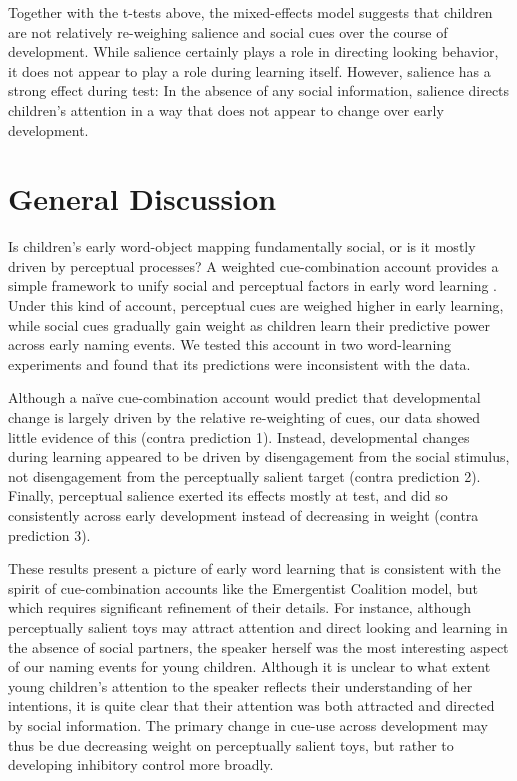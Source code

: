 \documentclass[man,floatsintext]{apa6}
\begin{document}
Together with the t-tests above, the mixed-effects model suggests that children are not relatively re-weighing salience and social cues over the course of development. While salience certainly plays a role in directing looking behavior, it does not appear to play a role during learning itself. However, salience has a strong effect during test: In the absence of any social information, salience directs children's attention in a way that does not appear to change over early development.

\section{General Discussion}

Is children's early word-object mapping fundamentally social, or is it mostly driven by perceptual processes? A weighted cue-combination account provides a simple framework to unify social and perceptual factors in early word learning \cite{Hollich2000, Frank2013a}. Under this kind of account, perceptual cues are weighed higher in early learning, while social cues gradually gain weight as children learn their predictive power across early naming events. We tested this account in two word-learning experiments and found that its predictions were inconsistent with the data. 

Although a na\"{i}ve cue-combination account would predict that developmental change is largely driven by the relative re-weighting of cues, our data showed little evidence of this (contra prediction 1). Instead, developmental changes during learning appeared to be driven by disengagement from the social stimulus, not disengagement from the perceptually salient target (contra prediction 2). Finally, perceptual salience exerted its effects mostly at test, and did so consistently across early development instead of decreasing in weight (contra prediction 3).

These results present a picture of early word learning that is consistent with the spirit of cue-combination accounts like the Emergentist Coalition model, but which requires significant refinement of their details. For instance, although perceptually salient toys may attract attention and direct looking and learning in the absence of social partners, the speaker herself was the most interesting aspect of our naming events for young children. Although it is unclear to what extent young children's attention to the speaker reflects their understanding of her intentions, it is quite clear that their attention was both attracted and directed by social information. The primary change in cue-use across development may thus be due decreasing weight on perceptually salient toys, but rather to developing inhibitory control more broadly.
\end{document}
